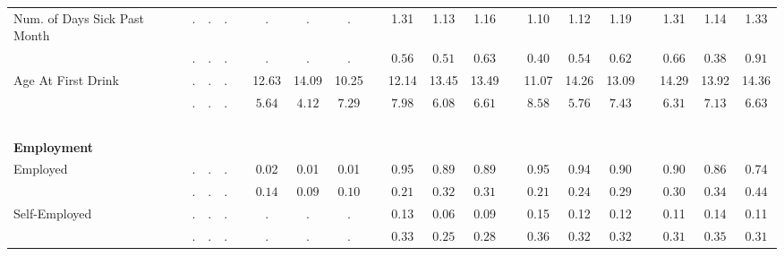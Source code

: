 \begin{center}
{\begin{longtable}{L{5cm} c c c p{.5cm} c c c p{.5cm} c c c p{.5cm} c c c p{.5cm} c c c}
 \quad Num. of Days Sick Past Month & . &         . &         . & &         . &         . &         . & &      1.31 &      1.13 &      1.16 & &      1.10 &      1.12 &      1.19 & &      1.31 &      1.14 &      1.33 \\*
 \quad & $\mathit{        .}$ & $\mathit{        .}$ & $\mathit{        .}$ & & $\mathit{        .}$ & $\mathit{        .}$ & $\mathit{        .}$ & & $\mathit{     0.56}$ & $\mathit{     0.51}$ & $\mathit{     0.63}$ & & $\mathit{     0.40}$ & $\mathit{     0.54}$ & $\mathit{     0.62}$ & & $\mathit{     0.66}$ & $\mathit{     0.38}$ & $\mathit{     0.91}$ \\[.2em]
 \quad Age At First Drink & . &         . &         . & &     12.63 &     14.09 &     10.25 & &     12.14 &     13.45 &     13.49 & &     11.07 &     14.26 &     13.09 & &     14.29 &     13.92 &     14.36 \\*
 \quad & $\mathit{        .}$ & $\mathit{        .}$ & $\mathit{        .}$ & & $\mathit{     5.64}$ & $\mathit{     4.12}$ & $\mathit{     7.29}$ & & $\mathit{     7.98}$ & $\mathit{     6.08}$ & $\mathit{     6.61}$ & & $\mathit{     8.58}$ & $\mathit{     5.76}$ & $\mathit{     7.43}$ & & $\mathit{     6.31}$ & $\mathit{     7.13}$ & $\mathit{     6.63}$ \\[.2em]
 ~\\[-.5em]
\textbf{Employment} \\[.6em]
 \quad Employed & . &         . &         . & &      0.02 &      0.01 &      0.01 & &      0.95 &      0.89 &      0.89 & &      0.95 &      0.94 &      0.90 & &      0.90 &      0.86 &      0.74 \\*
 \quad & $\mathit{        .}$ & $\mathit{        .}$ & $\mathit{        .}$ & & $\mathit{     0.14}$ & $\mathit{     0.09}$ & $\mathit{     0.10}$ & & $\mathit{     0.21}$ & $\mathit{     0.32}$ & $\mathit{     0.31}$ & & $\mathit{     0.21}$ & $\mathit{     0.24}$ & $\mathit{     0.29}$ & & $\mathit{     0.30}$ & $\mathit{     0.34}$ & $\mathit{     0.44}$ \\[.2em]
 \quad Self-Employed & . &         . &         . & &         . &         . &         . & &      0.13 &      0.06 &      0.09 & &      0.15 &      0.12 &      0.12 & &      0.11 &      0.14 &      0.11 \\*
 \quad & $\mathit{        .}$ & $\mathit{        .}$ & $\mathit{        .}$ & & $\mathit{        .}$ & $\mathit{        .}$ & $\mathit{        .}$ & & $\mathit{     0.33}$ & $\mathit{     0.25}$ & $\mathit{     0.28}$ & & $\mathit{     0.36}$ & $\mathit{     0.32}$ & $\mathit{     0.32}$ & & $\mathit{     0.31}$ & $\mathit{     0.35}$ & $\mathit{     0.31}$ \\[.2em]

\end{longtable}}
\end{center}
